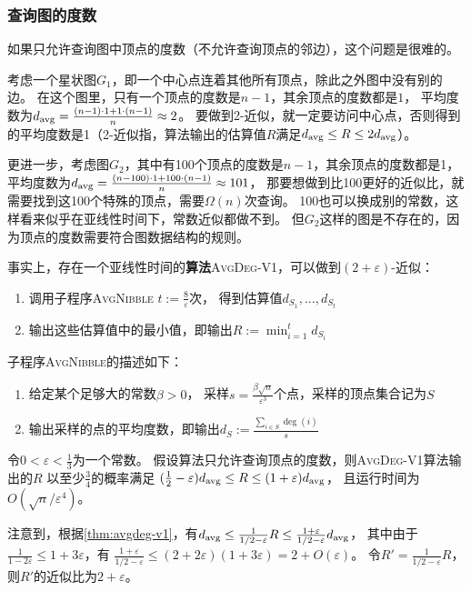 \subsubsection{查询图的度数}
如果只允许查询图中顶点的度数（不允许查询顶点的邻边），这个问题是很难的。

考虑一个星状图$G_1$，即一个中心点连着其他所有顶点，除此之外图中没有别的边。
在这个图里，只有一个顶点的度数是$n-1$，其余顶点的度数都是$1$，
平均度数为$d_{\mathrm{avg}}=\frac{(n-1)\cdot1+1\cdot(n-1)}{n}\approx2$。
要做到2-近似，就一定要访问中心点，否则得到的平均度数是1（2-近似指，算法输出的估算值$R$满足$d_{\mathrm{avg}}\le R\le2d_{\mathrm{avg}}$）。

更进一步，考虑图$G_2$，其中有100个顶点的度数是$n-1$，其余顶点的度数都是1，
平均度数为$d_{\mathrm{avg}}=\frac{(n-100)\cdot1+100\cdot(n-1)}{n}\approx 101$，
那要想做到比100更好的近似比，就需要找到这100个特殊的顶点，需要$\Omega(n)$次查询。
100也可以换成别的常数，这样看来似乎在亚线性时间下，常数近似都做不到。
但$G_2$这样的图是不存在的，因为顶点的度数需要符合图数据结构的规则。

事实上，存在一个亚线性时间的\textbf{算法}\textsc{AvgDeg-V1}，可以做到$(2+\varepsilon)$-近似：
\begin{enumerate}
    \item 调用子程序\textsc{AvgNibble} $t:=\frac{8}{\varepsilon}$次，
    得到估算值$d_{S_1},\dots,d_{S_t}$
    \item 输出这些估算值中的最小值，即输出$R:=\min_{i=1}^t d_{S_i}$
\end{enumerate}

子程序\textsc{AvgNibble}的描述如下：
\begin{enumerate}
    \item 给定某个足够大的常数$\beta>0$，
    采样$s=\frac{\beta\sqrt{n}}{\varepsilon^3}$个点，采样的顶点集合记为$S$
    \item 输出采样的点的平均度数，即输出$d_S:=\frac{\sum_{i\in S}\deg(i)}{s}$
\end{enumerate}


\begin{theorem}\label{thm:avgdeg-v1}
    令$0<\varepsilon<\frac{1}{3}$为一个常数。
    假设算法只允许查询顶点的度数，则\textsc{AvgDeg-V1}算法输出的$R$
    以至少$\frac{3}{4}$的概率满足
    $(\frac{1}{2}-\varepsilon)d_{\mathrm{avg}}\le R\le(1+\varepsilon)d_{\mathrm{avg}}$，
    且运行时间为$O(\sqrt{n}/\varepsilon^4)$。
\end{theorem}

注意到，根据\cref{thm:avgdeg-v1}，有$d_{\mathrm{avg}}\le\frac{1}{1/2-\varepsilon}R\le\frac{1+\varepsilon}{1/2-\varepsilon}d_{\mathrm{avg}}$，
其中由于$\frac{1}{1-2\varepsilon}\le 1+3\varepsilon$，有
$\frac{1+\varepsilon}{1/2-\varepsilon}\le(2+2\varepsilon)(1+3\varepsilon)=2+O(\varepsilon)$。
令$R'=\frac{1}{1/2-\varepsilon}R$，则$R'$的近似比为$2+\varepsilon$。

